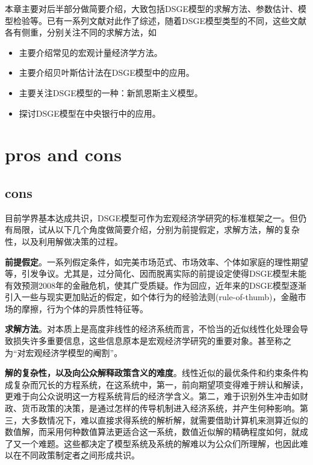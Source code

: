 本章主要对后半部分做简要介绍，大致包括DSGE模型的求解方法、参数估计、模型检验等。已有一系列文献对此作了综述，随着DSGE模型类型的不同，这些文献各有侧重，分别关注不同的求解方法，如
\begin{itemize}
  \item \cite{Canova:2009gc, Canova:2011vi, Balke:2012vl} 主要介绍常见的宏观计量经济学方法。
  \item \cite{An:2007cv, FernandezVillaverde:2010fq, DelNegro:2011wu, Herbst:2015wh}主要介绍贝叶斯估计法在DSGE模型中的应用。
  \item \cite{Gali:2005gp, Woodford:2011ks}主要关注DSGE模型的一种：新凯恩斯主义模型。
  \item \cite{Tovar:2009vb} 探讨DSGE模型在中央银行中的应用。
\end{itemize}

\section{pros and cons}
\subsection{cons}
目前学界基本达成共识，DSGE模型可作为宏观经济学研究的标准框架之一。但仍有局限，试从以下几个角度做简要介绍，分别为前提假定，求解方法，解的复杂性，以及利用解做决策的过程。

\textbf{前提假定}。一系列假定条件，如完美市场范式、市场效率、个体如家庭的理性期望等，引发争议。尤其是，过分简化、因而脱离实际的前提设定使得DSGE模型未能有效预测2008年的金融危机，使其广受质疑\citep{Buiter:2009ww}。作为回应，近年来的DSGE模型逐渐引入一些与现实更加贴近的假定，如个体行为的经验法则(rule-of-thumb)，金融市场的摩擦，行为个体的异质性特征等。

\textbf{求解方法}。对本质上是高度非线性的经济系统而言，不恰当的近似线性化处理会导致损失许多重要信息，这些信息原本是宏观经济学研究的重要对象。\cite{Buiter:2009ww}甚至称之为``对宏观经济学模型的阉割''。

\textbf{解的复杂性，以及向公众解释政策含义的难度}。线性近似的最优条件和约束条件构成复杂而冗长的方程系统，在这系统中，第一，前向期望项变得难于辨认和解读，更难于向公众说明这一方程系统背后的经济学含义。第二，难于识别外生冲击如财政、货币政策的决策，是通过怎样的传导机制进入经济系统，并产生何种影响。第三，大多数情况下，难以直接求得系统的解析解，就需要借助计算机来测算近似的数值解，而采用何种数值算法更适合这一系统，数值近似解的精确程度如何，就成了又一个难题。这些都决定了模型系统及系统的解难以为公众们所理解，也因此难以在不同政策制定者之间形成共识。

